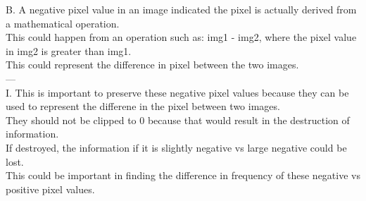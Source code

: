 B.  A negative pixel value in an image indicated the pixel is actually derived from a mathematical operation. \\
This could happen from an operation such as: img1 - img2, where the pixel value in img2 is greater than img1.\\
This could represent the difference in pixel between the two images.\\

---\\

I. This is important to preserve these negative pixel values because they can be used to represent the differene in the pixel between two images.\\
They should not be clipped to 0 because that would result in the destruction of information. \\
If destroyed, the information if it is slightly negative vs large negative could be lost. \\
This could be important in finding the difference in frequency of these negative vs positive pixel values. \\